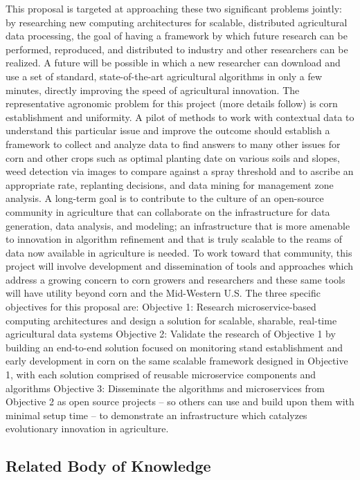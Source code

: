\documentclass[11pt]{article}
\begin{document}
This proposal is targeted at approaching these two significant problems jointly: by researching new computing architectures 
for scalable, distributed agricultural data processing, the goal of having a framework by which future research can be 
performed, reproduced, and distributed to industry and other researchers can be realized.  A future will be possible in 
which a new researcher can download and use a set of standard, state-of-the-art agricultural algorithms in only a few minutes, 
directly improving the speed of agricultural innovation.
The representative agronomic problem for this project (more details follow) is corn establishment and uniformity.  A pilot of 
methods to work with contextual data to understand this particular issue and improve the outcome should establish 
a framework to collect and analyze data to find answers to many other issues for corn and other crops such as optimal 
planting date on various soils and slopes, weed detection via images to compare against a spray threshold and to 
ascribe an appropriate rate, replanting decisions, and data mining for management zone analysis.
A long-term goal is to contribute to the culture of an open-source community in agriculture that can collaborate on 
the infrastructure for data generation, data analysis, and modeling; an infrastructure that is more amenable to innovation in 
algorithm refinement and that is truly scalable to the reams of data now available in agriculture is needed. To work 
toward that community, this project will involve development and dissemination of tools and approaches which address a 
growing concern to corn growers and researchers and these same tools will have utility beyond corn and the Mid-Western U.S.
The three specific objectives for this proposal are:
Objective 1: Research microservice-based computing architectures and design a solution for scalable, sharable, real-time 
agricultural data systems
Objective 2: Validate the research of Objective 1 by building an end-to-end solution focused on monitoring stand 
establishment and early development in corn on the same scalable framework designed in Objective 1, with each 
solution comprised of reusable microservice components and algorithms
Objective 3: Disseminate the algorithms and microservices from Objective 2 as open source projects -- so others can 
use and build upon them with minimal setup time -- to demonstrate an infrastructure which catalyzes evolutionary 
innovation in agriculture.

\subsection{Related Body of Knowledge}
\end{document}
